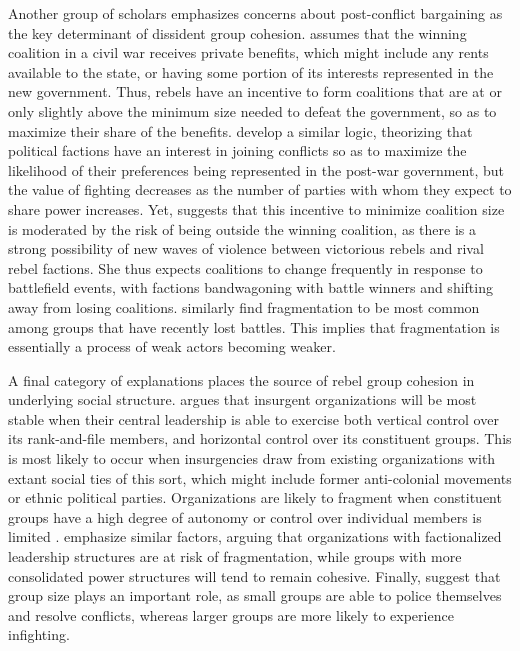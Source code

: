 Another group of scholars emphasizes concerns about post-conflict bargaining as the key determinant of dissident group cohesion. \citet{Christia2012} assumes that the winning coalition in a civil war receives private benefits, which might include any rents available to the state, or having some portion of its interests represented in the new government. Thus, rebels have an incentive to form coalitions that are at or only slightly above the minimum size needed to defeat the government, so as to maximize their share of the benefits. \citet{Wolford} develop a similar logic, theorizing that political factions have an interest in joining conflicts so as to maximize the likelihood of their preferences being represented in the post-war government, but the value of fighting decreases as the number of parties with whom they expect to share power increases. Yet, \citet[Ch. 2]{Christia2012} suggests that this incentive to minimize coalition size is moderated by the risk of being outside the winning coalition, as there is a strong possibility of new waves of violence between victorious rebels and rival rebel factions. She thus expects coalitions to change frequently in response to battlefield events, with factions bandwagoning with battle winners and shifting away from losing coalitions. \citet{Findley2012} similarly find fragmentation to be most common among groups that have recently lost battles. This implies that fragmentation is essentially a process of weak actors becoming weaker.

A final category of explanations places the source of rebel group cohesion in underlying social structure. \citet{Staniland2014} argues that insurgent organizations will be most stable when their central leadership is able to exercise both vertical control over its rank-and-file members, and horizontal control over its constituent groups. This is most likely to occur when insurgencies draw from existing organizations with extant social ties of this sort, which might include former anti-colonial movements or ethnic political parties. Organizations are likely to fragment when constituent groups have a high degree of autonomy or control over individual members is limited \citep[Ch 2-3]{Staniland2014}. \citet{Asal2012} emphasize similar factors, arguing that organizations with factionalized leadership structures are at risk of fragmentation, while groups with more consolidated power structures will tend to remain cohesive. Finally, \citet{Warren2015} suggest that group size plays an important role, as small groups are able to police themselves and resolve conflicts, whereas larger groups are more likely to experience infighting.


